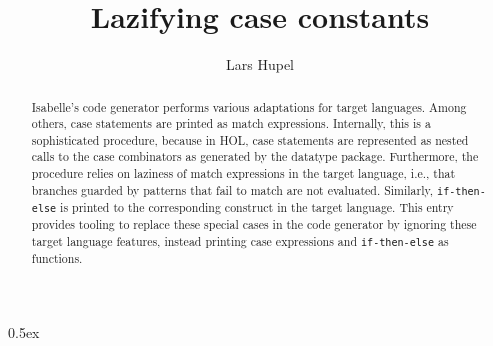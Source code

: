 \documentclass[11pt,a4paper]{article}
\begin{document}
\title{Lazifying case constants}
\author{Lars Hupel}
\maketitle

\begin{abstract}
  Isabelle's code generator performs various adaptations for target languages. Among others,
  case statements are printed as match expressions. Internally, this is a sophisticated procedure,
  because in HOL, case statements are represented as nested calls to the case combinators as
  generated by the datatype package. Furthermore, the procedure relies on laziness of match
  expressions in the target language, i.e., that branches guarded by patterns that fail to match are
  not evaluated. Similarly, \texttt{if-then-else} is printed to the corresponding construct in the
  target language. This entry provides tooling to replace these special cases in the code generator
  by ignoring these target language features, instead printing case expressions and
  \texttt{if-then-else} as functions.
\end{abstract}

\parindent 0pt\parskip 0.5ex



%
%
\end{document}
